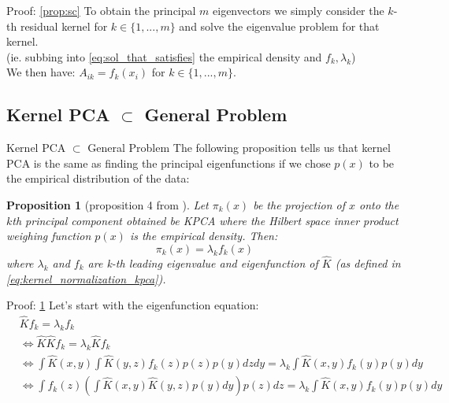 \documentclass[aspectratio=169]{beamer}
\newtheorem{prop}{Proposition}
\begin{document}
\begin{frame}{Proof: \cref{prop:sc}}
  To obtain the principal $m$ eigenvectors we simply consider the $k$-th residual kernel for $k \in \{1,...,m\}$ and solve the eigenvalue problem for that kernel.
  \\ \hfill \break
  (ie. subbing into \cref{eq:sol_that_satisfies} the empirical density and $f_{k}, \lambda_{k}$)
  \\ \hfill \break
  We then have: $A_{ik} = f_{k} (x_{i})$ for $k \in \{1,...,m\}$.
\end{frame}

\subsection{Kernel PCA \texorpdfstring{$\subset$}{TEXT} General Problem}
\begin{frame}{Kernel PCA \texorpdfstring{$\subset$}{TEXT} General Problem}
  The following proposition tells us that kernel PCA is the same as finding the principal eigenfunctions if we chose $p(x)$ to be the empirical distribution of the data:
  \begin{prop}[proposition 4 from \cite{bengio2003learning}] \label{prop:kpca}
  Let $\pi_{k}(x)$ be the projection of $x$ onto the $k$th principal component obtained be KPCA where the Hilbert space inner product weighing function $p(x)$ is the empirical density. Then:
  \begin{equation*}
    \pi_{k} (x) = \lambda_{k} f_{k} (x)
  \end{equation*}  
  where $\lambda_{k}$ and $f_{k}$ are k-th leading eigenvalue and eigenfunction of $\hat{K}$ (as defined in \cref{eq:kernel_normalization_kpca}). 
  \end{prop}
\end{frame}

\begin{frame}{Proof: \cref{prop:kpca}}
  Let's start with the eigenfunction equation:
  \begin{align*}
    &{} \hat{K} f_{k} = \lambda_{k} f_{k} \\
    & \iff \hat{K} \hat{K} f_{k} = \lambda_{k} \hat{K} f_{k} \\
    & \iff \int \hat{K}(x,y) \int \hat{K}(y,z) f_{k}(z) p(z) p(y) dz dy = \lambda_{k} \int \hat{K}(x,y) f_{k}(y) p(y) dy \\
    & \iff \int f_{k}(z) (\int \hat{K}(x,y) \hat{K}(y,z) p(y) dy) p(z) dz = \lambda_{k} \int \hat{K}(x,y) f_{k}(y) p(y) dy \\ 
  \end{align*}
\end{frame}
\end{document}
